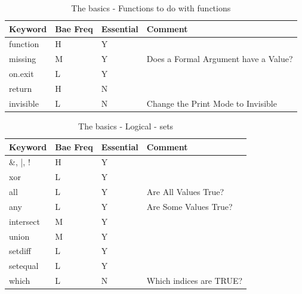 \documentclass[11pt,]{krantz}
\theoremstyle{definition}
\theoremstyle{definition}
\theoremstyle{remark}
\begin{document}
\begin{table}

\caption{\label{tab:knitchunk5}The basics - Functions to do with functions}
\centering
\begin{tabular}[t]{llll}
\toprule
Keyword & Bae Freq & Essential & Comment\\
\midrule
function & H & Y & \\
missing & M & Y & Does a Formal Argument have a Value?\\
on.exit & L & Y & \\
return & H & N & \\
invisible & L & N & Change the Print Mode to Invisible\\
\bottomrule
\end{tabular}
\end{table}

\begin{table}

\caption{\label{tab:knitchunk6}The basics - Logical - sets }
\centering
\begin{tabular}[t]{llll}
\toprule
Keyword & Bae Freq & Essential & Comment\\
\midrule
\&, |, ! & H & Y & \\
xor & L & Y & \\
all & L & Y & Are All Values True?\\
any & L & Y & Are Some Values True?\\
intersect & M & Y & \\
\addlinespace
union & M & Y & \\
setdiff & L & Y & \\
setequal & L & Y & \\
which & L & N & Which indices are TRUE?\\
\bottomrule
\end{tabular}
\end{table}
\end{document}
